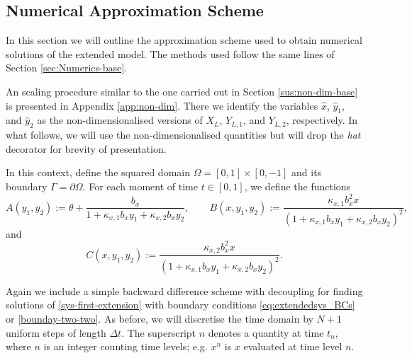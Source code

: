 \documentclass[11pt]{article}
\numberwithin{equation}{section}
\begin{document}
\subsection{Numerical Approximation Scheme}
\label{sec:Numerics-extension}

In this section we will outline the approximation scheme used to obtain numerical solutions of the extended model. The methods used follow the same lines of Section \ref{sec:Numerics-base}. 

An scaling procedure similar to the one carried out in Section \ref{sus:non-dim-base} is presented in Appendix \ref{app:non-dim}. There we identify the variables \( \hat x\), \(\hat y_1\), and \(\hat y_2\) as the non-dimensionalised versions of \(X_L\), \(Y_{L,1}\), and \(Y_{L,2}\), respectively. In what follows, we will use the non-dimensionalised quantities but will drop the \emph{hat} decorator for brevity of presentation.

In this context, define the squared domain \( \Omega = [0,1] \times [0,-1]\) and its boundary \( \Gamma = \partial \Omega\). For each moment of time \(t\in [0,1]\), we define the functions 
\[
    A(y_1, y_2) := \theta + \frac{b_x}{1 + \kappa_{x,1} b_{x} y_1 + \kappa_{x,2} b_{x} y_2},
    \qquad
    B(x, y_1, y_2) := \frac{\kappa_{x,1} b_x^2 x}{(1 + \kappa_{x,1} b_{x} y_1 + \kappa_{x,2} b_{x} y_2 )^2},
\]
and
\[
    C(x, y_1, y_2) := \frac{\kappa_{x,2} b_x^2 x}{(1 + \kappa_{x,1} b_{x} y_1 + \kappa_{x,2} b_{x} y_2 )^2}.
\]




Again we include a simple backward difference scheme with decoupling for finding solutions of \eqref{sys-first-extension} with boundary conditions \eqref{eq:extendedsys_BCs} or \eqref{bounday-two-two}. As before, we will discretise the time domain by \(N+1\) uniform steps of length \(\Delta t\). The superscript $n$ denotes a quantity at time $t_n$, where $n$ is an integer counting time levels; e.g. $x^n$ is $x$ evaluated at time level $n$. 
\end{document}
